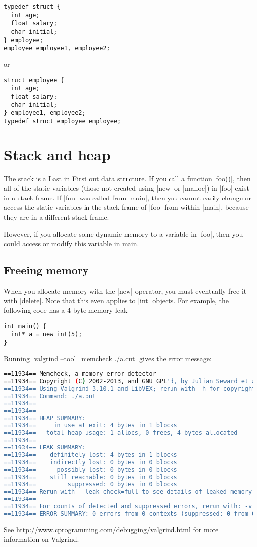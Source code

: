 \documentclass[a4paper,12pt,oneside]{book}
\begin{document}
{\begin{lstlisting}
typedef struct {
  int age;
  float salary;
  char initial;
} employee;
employee employee1, employee2;
\end{lstlisting}

or

\begin{lstlisting}
struct employee {
  int age;
  float salary;
  char initial;
} employee1, employee2;
typedef struct employee employee;
\end{lstlisting}
\section{Stack and heap}
The stack is a Last in First out data structure. If you call a function \lst|foo()|, then all of the static variables (those not created using \lst|new| or \lst|malloc|) in \lst|foo| exist in a stack frame. If \lst|foo| was called from \lst|main|, then you cannot easily change or access the static variables in the stack frame of \lst|foo| from within \lst|main|, because they are in a different stack frame.

However, if you allocate some dynamic memory to a variable in \lst|foo|, then you could access or modify this variable in main.
\subsection{Freeing memory}
When you allocate memory with the \lst|new| operator, you must eventually free it with \lst|delete|. Note that this even applies to \lst|int| objects. For example, the following code has a 4 byte memory leak:

\begin{lstlisting}[caption={Memory leak}]
int main() {
  int* a = new int(5);
}
\end{lstlisting}

Running \lst|valgrind --tool=memcheck ./a.out| gives the error message:
\begin{lstlisting}[language=bash, caption={Valgrind output}]
==11934== Memcheck, a memory error detector
==11934== Copyright (C) 2002-2013, and GNU GPL'd, by Julian Seward et al.
==11934== Using Valgrind-3.10.1 and LibVEX; rerun with -h for copyright info
==11934== Command: ./a.out
==11934== 
==11934== 
==11934== HEAP SUMMARY:
==11934==     in use at exit: 4 bytes in 1 blocks
==11934==   total heap usage: 1 allocs, 0 frees, 4 bytes allocated
==11934== 
==11934== LEAK SUMMARY:
==11934==    definitely lost: 4 bytes in 1 blocks
==11934==    indirectly lost: 0 bytes in 0 blocks
==11934==      possibly lost: 0 bytes in 0 blocks
==11934==    still reachable: 0 bytes in 0 blocks
==11934==         suppressed: 0 bytes in 0 blocks
==11934== Rerun with --leak-check=full to see details of leaked memory
==11934== 
==11934== For counts of detected and suppressed errors, rerun with: -v
==11934== ERROR SUMMARY: 0 errors from 0 contexts (suppressed: 0 from 0)
\end{lstlisting}
See \url{http://www.cprogramming.com/debugging/valgrind.html} for more information on Valgrind.

}
\end{document}
